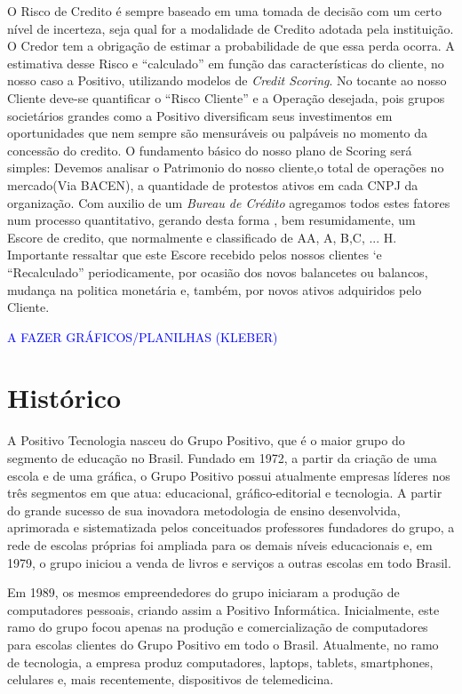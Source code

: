 O Risco de Credito é sempre baseado em uma tomada de decisão com um certo nível de incerteza, seja qual for a modalidade de Credito adotada pela instituição. O Credor tem a obrigação de estimar a probabilidade de que essa  perda ocorra.
A estimativa desse Risco e “calculado” em função das características do cliente, no nosso caso a Positivo, utilizando modelos de \emph{Credit Scoring}.
No tocante ao nosso Cliente deve-se quantificar o “Risco Cliente” e a Operação desejada, pois grupos societários grandes como a Positivo diversificam seus investimentos em oportunidades que nem sempre são mensuráveis ou palpáveis no momento da concessão do credito.
O fundamento básico do nosso plano de Scoring será simples: Devemos analisar o Patrimonio do nosso cliente,o total de operações no mercado(Via BACEN), a quantidade de protestos ativos em cada CNPJ da organização. Com auxilio de um \emph{Bureau de Crédito} agregamos todos estes fatores num processo quantitativo, gerando desta forma , bem resumidamente, um Escore de credito, que normalmente e classificado de AA, A, B,C, ... H. Importante ressaltar que este Escore recebido pelos nossos clientes ‘e “Recalculado” periodicamente, por ocasião dos novos balancetes ou balancos, mudança na politica monetária e, também, por novos ativos adquiridos pelo Cliente.

\textcolor{blue}{A FAZER GRÁFICOS/PLANILHAS (KLEBER)}

\section{Histórico}
A Positivo Tecnologia nasceu do Grupo Positivo, que é o maior grupo do segmento de educação no Brasil. Fundado em 1972, a partir da criação de uma escola e de uma gráfica, o Grupo Positivo possui atualmente empresas líderes nos três segmentos em que atua: educacional, gráfico-editorial e tecnologia. A partir do grande sucesso de sua inovadora metodologia de ensino desenvolvida, aprimorada e sistematizada pelos conceituados professores fundadores do grupo, a rede de escolas próprias foi ampliada para os demais níveis educacionais e, em 1979, o grupo iniciou a venda de livros e serviços a outras escolas em todo Brasil.

Em 1989, os mesmos empreendedores do grupo iniciaram a produção de computadores pessoais, criando assim a Positivo Informática. Inicialmente, este ramo do grupo focou apenas na produção e comercialização de computadores para escolas clientes do Grupo Positivo em todo o Brasil. Atualmente, no ramo de tecnologia, a empresa produz computadores, laptops, tablets, smartphones, celulares e, mais recentemente, dispositivos de telemedicina. 

